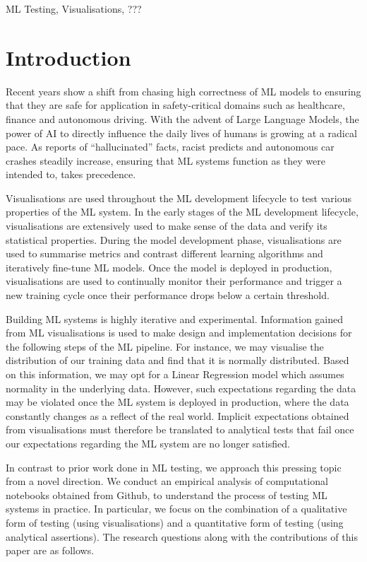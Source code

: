 \documentclass[conference]{IEEEtran}
\begin{document}
\begin{IEEEkeywords}
  ML Testing, Visualisations, ???
\end{IEEEkeywords}

\section{Introduction}\label{sec:intro}

Recent years show a shift from chasing high correctness of ML models to ensuring that they are safe for application in safety-critical domains such as healthcare, finance and autonomous driving. With the advent of Large Language Models, the power of AI to directly influence the daily lives of humans is growing at a radical pace. As reports of ``hallucinated'' facts, racist predicts and autonomous car crashes steadily increase, ensuring that ML systems function as they were intended to, takes precedence.

Visualisations are used throughout the ML development lifecycle to test various properties of the ML system. In the early stages of the ML development lifecycle, visualisations are extensively used to make sense of the data and verify its statistical properties. During the model development phase, visualisations are used to summarise metrics and contrast different learning algorithms and iteratively fine-tune ML models. Once the model is deployed in production, visualisations are used to continually monitor their performance and trigger a new training cycle once their performance drops below a certain threshold.

Building ML systems is highly iterative and experimental. Information gained from ML visualisations is used to make design and implementation decisions for the following steps of the ML pipeline. For instance, we may visualise the distribution of our training data and find that it is normally distributed. Based on this information, we may opt for a Linear Regression model which assumes normality in the underlying data. However, such expectations regarding the data may be violated once the ML system is deployed in production, where the data constantly changes as a reflect of the real world. Implicit expectations obtained from visualisations must therefore be translated to analytical tests that fail once our expectations regarding the ML system are no longer satisfied.

In contrast to prior work done in ML testing, we approach this pressing topic from a novel direction. We conduct an empirical analysis of computational notebooks obtained from Github, to understand the process of testing ML systems in practice. In particular, we focus on the combination of a qualitative form of testing (using visualisations) and a quantitative form of testing (using analytical assertions). The research questions along with the contributions of this paper are as follows.
\end{document}
